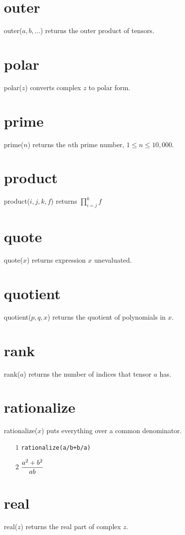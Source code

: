 \documentclass[12pt,openany]{report}
\begin{document}
\section*{outer}
outer($a,b,\ldots$) returns the outer product of tensors.

\section*{polar}
polar($z$) converts complex $z$ to polar form.

\section*{prime}
prime($n$) returns the $n$th prime number, $1\le n\le10{,}000$.

\section*{product}
product($i,j,k,f$) returns $\displaystyle\prod_{i=j}^k f$

\section*{quote}
quote($x$) returns expression $x$ unevaluated.

\section*{quotient}
quotient($p,q,x$) returns the quotient of polynomials in $x$.

\section*{rank}
rank($a$) returns the number of indices that tensor $a$ has.

\section*{rationalize}
rationalize($x$) puts everything over a common denominator.
\begin{itemize}
\item[$\scriptstyle1$]{\tt rationalize(a/b+b/a)}
\item[$\scriptstyle2$]\hspace{50pt} $\displaystyle{a^2+b^2\over ab}$
\end{itemize}

\section*{real}
real($z$) returns the real part of complex $z$.
\end{document}
